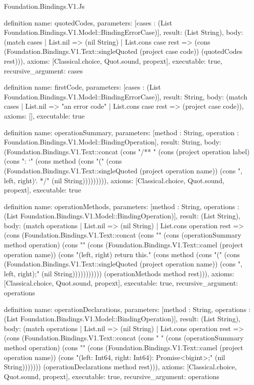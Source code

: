 \begin{lexlean}{Foundation.Bindings.V1.Js}
\begin{semanticmodule}
definition{
  name: quotedCodes,
  parameters: [cases : (List Foundation.Bindings.V1.Model::BindingErrorCase)],
  result: (List String),
  body: (match cases
    | List.nil => (nil String)
    | List.cons case rest => (cons (Foundation.Bindings.V1.Text::singleQuoted (project case code)) (quotedCodes rest))),
  axioms: [Classical.choice, Quot.sound, propext],
  executable: true,
  recursive_argument: cases
}

definition{
  name: firstCode,
  parameters: [cases : (List Foundation.Bindings.V1.Model::BindingErrorCase)],
  result: String,
  body: (match cases | List.nil => "an error code" | List.cons case rest => (project case code)),
  axioms: [],
  executable: true
}

definition{
  name: operationSummary,
  parameters: [method : String, operation : Foundation.Bindings.V1.Model::BindingOperation],
  result: String,
  body: (Foundation.Bindings.V1.Text::concat (cons "/** " (cons (project operation label) (cons ": `" (cons method (cons "(" (cons (Foundation.Bindings.V1.Text::singleQuoted (project operation name)) (cons ", left, right)`. */" (nil String))))))))),
  axioms: [Classical.choice, Quot.sound, propext],
  executable: true
}

definition{
  name: operationMethods,
  parameters: [method : String, operations : (List Foundation.Bindings.V1.Model::BindingOperation)],
  result: (List String),
  body: (match operations
    | List.nil => (nil String)
    | List.cons operation rest => (cons (Foundation.Bindings.V1.Text::concat (cons "\n  " (cons (operationSummary method operation) (cons "\n  " (cons (Foundation.Bindings.V1.Text::camel (project operation name)) (cons "(left, right) {\n    return this." (cons method (cons "(" (cons (Foundation.Bindings.V1.Text::singleQuoted (project operation name)) (cons ", left, right);\n  }" (nil String))))))))))) (operationMethods method rest))),
  axioms: [Classical.choice, Quot.sound, propext],
  executable: true,
  recursive_argument: operations
}

definition{
  name: operationDeclarations,
  parameters: [method : String, operations : (List Foundation.Bindings.V1.Model::BindingOperation)],
  result: (List String),
  body: (match operations
    | List.nil => (nil String)
    | List.cons operation rest => (cons (Foundation.Bindings.V1.Text::concat (cons "  " (cons (operationSummary method operation) (cons "\n  " (cons (Foundation.Bindings.V1.Text::camel (project operation name)) (cons "(left: Int64, right: Int64): Promise<bigint>;" (nil String))))))) (operationDeclarations method rest))),
  axioms: [Classical.choice, Quot.sound, propext],
  executable: true,
  recursive_argument: operations
}


\end{semanticmodule}
\end{lexlean}
